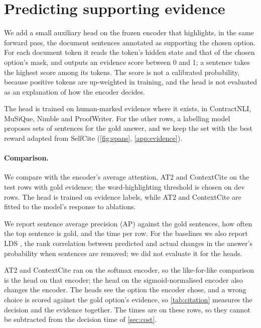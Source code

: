 \section{Predicting supporting evidence}
\label{sec:citation}

We add a small auxiliary head on the frozen encoder that highlights, in the same forward pass, the document sentences annotated as supporting the chosen option.
For each document token it reads the token's hidden state and that of the chosen option's mask, and outputs an evidence score between 0 and 1; a sentence takes the highest score among its tokens.
The score is not a calibrated probability, because positive tokens are up-weighted in training, and the head is not evaluated as an explanation of how the encoder decides.

The head is trained on human-marked evidence where it exists, in ContractNLI, MuSiQue, Nimble and ProofWriter.
For the other rows, a labelling model proposes sets of sentences for the gold answer, and we keep the set with the best reward adapted from SelfCite \citep{selfcite} (\cref{fig:spans}, \cref{app:evidence}).



\paragraph{Comparison.}
We compare with the encoder's average attention, AT2 \citep{at2} and ContextCite \citep{contextcite} on the \EvRows{} test rows with gold evidence; the word-highlighting threshold is chosen on \EvTuneRows{} dev rows.
The head is trained on evidence labels, while AT2 and ContextCite are fitted to the model's response to ablations.

We report sentence average precision (AP) against the gold sentences, how often the top sentence is gold, and the time per row.
For the baselines we also report LDS \citep{contextcite}, the rank correlation between predicted and actual changes in the answer's probability when sentences are removed; we did not evaluate it for the heads.

AT2 and ContextCite ran on the softmax encoder, so the like-for-like comparison is the head on that encoder; the head on the sigmoid-normalised encoder also changes the encoder.
The heads see the option the encoder chose, and a wrong choice is scored against the gold option's evidence, so \cref{tab:citation} measures the decision and the evidence together.
The times are on these rows, so they cannot be subtracted from the decision time of \cref{sec:cost}.

